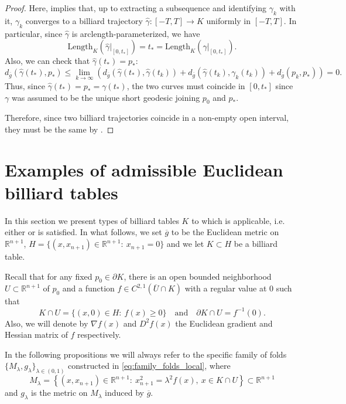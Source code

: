 \documentclass[11pt]{article}
\theoremstyle{definition}
\theoremstyle{remark}
\theoremstyle{plain}
\newcommand{\R}{\mathbb{R}}
\newcommand{\g}{\overline{g}}
\newcommand{\M}{M_\lambda}
\begin{document}
\begin{proof}
Here,  implies that, up to extracting a subsequence and identifying $\gamma_k$ with it, $\gamma_k$ converges to a billiard trajectory $\hat{\gamma}:[-T,T]\to K$ uniformly in $[-T,T]$. In particular, since $\hat\gamma$ is arclength-parameterized, we have 
$$\mbox{Length}_K(\hat\gamma|_{[0,t_*]})= t_* = \mbox{Length}_K(\gamma|_{[0,t_*]}).$$
Also, we can check that $\hat\gamma(t_*) = p_*$:
$$d_{\g}(\hat\gamma(t_*),p_*)\le \lim_{k\to \infty}(d_{\g}(\hat\gamma(t_*),\hat\gamma(t_k)) + d_{\g}(\hat\gamma(t_k),\gamma_k(t_k)) + d_{\g}(p_k,p_*)) = 0.$$
Thus, since $\hat\gamma(t_*) = p_* = \gamma(t_*)$, the two curves must coincide in $[0,t_*]$ since $\gamma$ was assumed to be the unique short geodesic joining $p_0$ and $p_*$.

Therefore, since two billiard trajectories coincide in a non-empty open interval, they must be the same by .

\end{proof} 













\section{Examples of admissible Euclidean billiard tables}

In this section we present types of billiard tables $K$ to which  is applicable, i.e. either  or  is satisfied. In what follows, we set $\g$ to be the Euclidean metric on $\R^{n+1}$, $H=\{(x,x_{n+1})\in\R^{n+1}:\ x_{n+1}=0\}$ and we let $K\subset H$ be a billiard table. 

Recall that for any fixed $p_0\in \partial K$, there is an open bounded neighborhood $U\subset \R^{n+1}$ of $p_0$ and a function $f\in C^{2,1}(\overline{U}\cap K)$ with a regular value at $0$ such that
\begin{equation}\label{eq:table}
  K\cap U = \{(x,0)\in H:\ f(x)\ge 0\}\quad \text{and}\quad \partial K\cap U = f^{-1}(0).
\end{equation}
Also, we will denote by $\nabla f(x)$ and $D^2f(x)$ the Euclidean gradient and Hessian matrix of $f$ respectively. 

In the following propositions we will always refer to the specific family of folds $\{\M,g_\lambda\}_{\lambda\in (0,1)}$ constructed in \cref{eq:family_folds_local}, where
$$\M = \left\{(x,x_{n+1})\in \R^{n+1}:\ x_{n+1}^2 = \lambda^2f(x),\ x\in K\cap U\right\}\subset \R^{n+1}$$
and $g_\lambda$ is the metric on $\M$ induced by $\overline{g}$.
\end{document}
